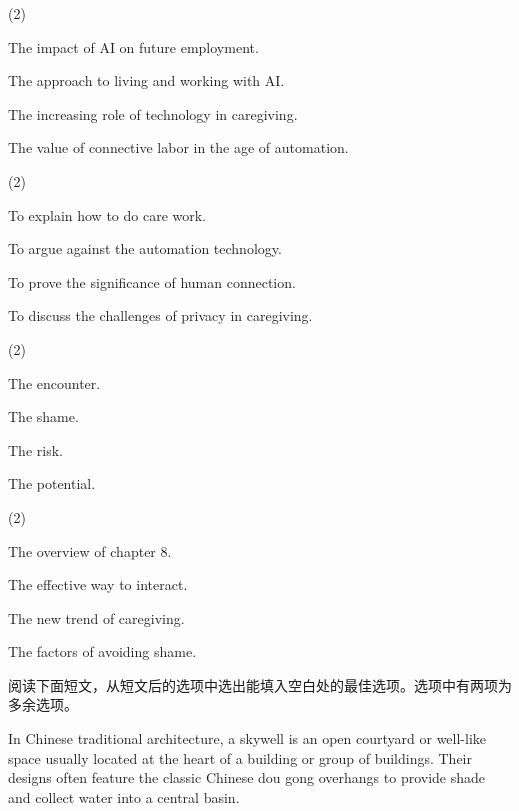 \documentclass{英语试卷}
\begin{document}
\begin{choices}(2)
  \item The impact of AI on future employment.
  \item The approach to living and working with AI.
  \item The increasing role of technology in caregiving.
  \item The value of connective labor in the age of automation.
\end{choices}
\begin{choices}(2)
  \item To explain how to do care work.
  \item To argue against the automation technology.
  \item To prove the significance of human connection.
  \item To discuss the challenges of privacy in caregiving.
\end{choices}
\begin{choices}(2)
  \item The encounter.
  \item The shame.
  \item The risk.
  \item The potential.
\end{choices}
\begin{choices}(2)
  \item The overview of chapter 8.
  \item The effective way to interact.
  \item The new trend of caregiving.
  \item The factors of avoiding shame.
\end{choices}
\par 阅读下面短文，从短文后的选项中选出能填入空白处的最佳选项。选项中有两项为多余选项。\par
\par In Chinese traditional architecture, a skywell is an open courtyard or well-like space usually located at the heart of a building or group of buildings.  Their designs often feature the classic Chinese dou gong overhangs to provide shade and collect water into a central basin.\par
\end{document}
